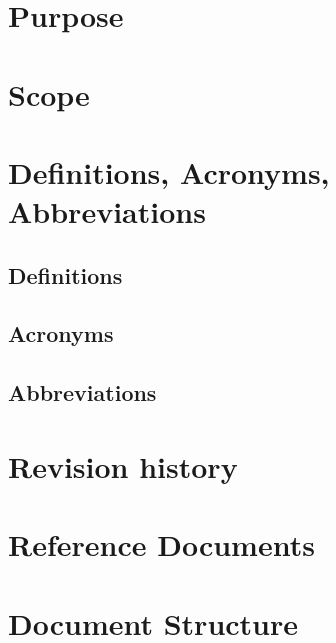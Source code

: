 \section{Purpose}

\section{Scope}

\section{Definitions, Acronyms, Abbreviations}
\subsection{Definitions}
\subsection{Acronyms}
\subsection{Abbreviations}

\section{Revision history}

\section{Reference Documents}

\section{Document Structure}
